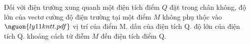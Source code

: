\begin{ex}
Đối với điện trường xung quanh một điện tích điểm $Q$ đặt trong chân không, độ lớn của vectơ cường độ điện trường tại một điểm $M$ không phụ thộc vào $\nguon{ly11 kntt.pdf}$
\choice
{vị trí của điểm M.}
{\True dấu của điện tích Q.}
{độ lớn của điện tích Q.}
{khoảng cách từ điễm $M$ đến điện tích điểm Q.}
\end{ex}
